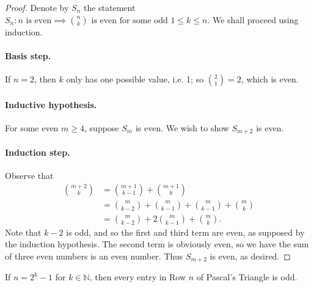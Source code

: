 \documentclass{exam}
\begin{document}
\begin{proof}
    Denote by $S_n$ the statement $S_n:n\text{ is even}\implies\binom n k\text{ is even for some odd }1\le k\le n$. We shall proceed using induction.

    \paragraph{Basis step.} If $n = 2$, then $k$ only has one possible value, i.e. 1; so $\binom21=2$, which is even.

    \paragraph{Inductive hypothesis.} For some even $m\ge 4$, suppose $S_m$ is even. We wish to show $S_{m+2}$ is even.

    \paragraph{Induction step.} Observe that
    \begin{align*}
        \binom{m+2}k &= \binom{m+1}{k-1} + \binom{m+1}k\\
        &= \binom{m}{k-2} + \binom{m}{k-1} + \binom{m}{k-1} + \binom{m}k\\
        &= \binom{m}{k-2} + 2\binom{m}{k-1} + \binom{m}k.
    \end{align*}
    Note that $k-2$ is odd, and so the first and third term are even, as supposed by the induction hypothesis. The second term is obviously even, so we have the sum of three even numbers is an even number. Thus $S_{m+2}$ is even, as desired.
\end{proof}
\newpage
\begin{proposition}{10.36}
    If $n = 2^k-1$ for $k\in\mathbb N$, then every entry in Row $n$ of Pascal's Triangle is odd.
\end{proposition}
\end{document}
